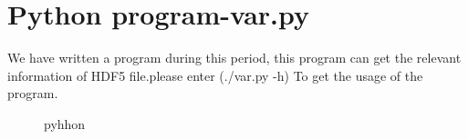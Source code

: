 \section{Python program-var.py}
We have written a program during this period, this program can get the relevant information of HDF5 file.please enter (./var.py -h) To get the usage of the program.
\begin{figure}[htbp]
\centering
 \caption{pyhhon}
\label{pd}
\end{figure}

